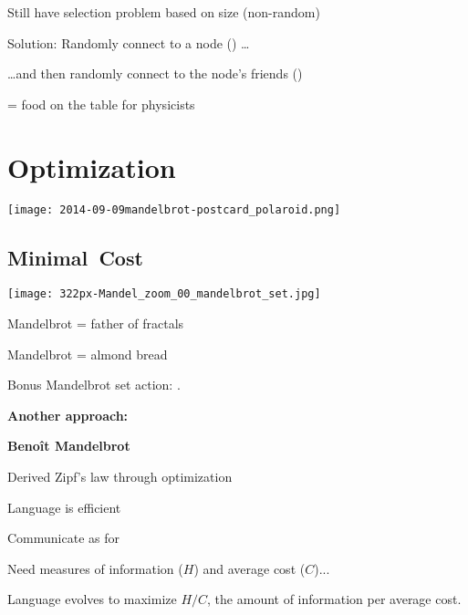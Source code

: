     Still have selection problem based on size (non-random)
   
    Solution: Randomly connect to a node () \ldots
   
    \ldots and then randomly connect to the node's friends ()
   
     = food on the table for physicists
  
  
  


\section{Optimization}


  \texttt{[image: 2014-09-09mandelbrot-postcard\_polaroid.png]}

\subsection{Minimal\ Cost}


  \textbf{}
    \bigskip
  
          
      
      \texttt{[image: 322px-Mandel\_zoom\_00\_mandelbrot\_set.jpg]}
      
    
    \bigskip
    \bigskip
    
    
      Mandelbrot = father of fractals
    
      Mandelbrot = almond bread
     
      Bonus Mandelbrot set action: .
    
  

  

  \textbf{Another approach:}

  \textbf{Beno\^{i}t Mandelbrot}
    
     
      Derived Zipf's law through optimization\cite{mandelbrot1953a}
     
       Language is efficient
     
      Communicate as 
      for 
     
      Need measures of information ($H$) and average cost ($C$)...
     
      Language evolves to maximize $H/C$,
      the amount of information per average cost.
     
